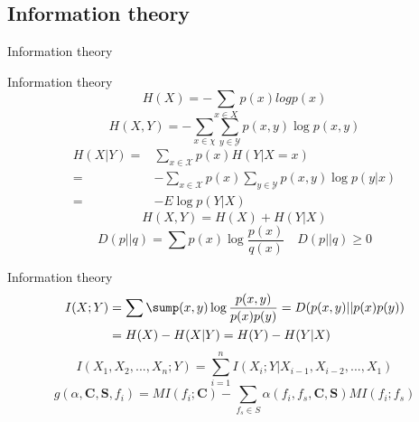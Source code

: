 \documentclass{beamer}
\begin{document}
\subsection{Information theory}
\begin{frame}{}
\begin{center}
{\Huge Information theory}
\end{center}
\end{frame}


\begin{frame}{Information theory}
\begin{equation}
H(X)=-\sum_{x \in X} p(x)log p(x)
\end{equation}
\begin{equation}
H(X,Y)=-\sum_{x\in \chi}\sum_{y\in \mathcal{Y}}p(x,y)\log p(x,y)
\end{equation}
\begin{equation}
\begin{split}
H(X|Y)=& \sum_{x\in \mathcal{X} }p(x)H(Y|X=x)\\
=& -\sum_{x\in \mathcal{X}}p(x)\sum_{y\in \mathcal{Y}}p(x,y)\log p(y|x) \\
=& -E\log p(Y|X)
\end{split}
\end{equation}
\begin{equation}
H(X,Y)=H(X)+H(Y|X)
\end{equation}
\begin{equation}
D(p||q)=\sum p(x)\log\frac{p(x)}{q(x)} \quad D(p||q)\geq 0
\end{equation}

\end{frame}

\begin{frame}{Information theory}
\begin{equation}
\begin{split}
I(X;Y)&=\sum\sump(x,y)\log\dfrac{p(x,y)}{p(x)p(y)}=D(p(x,y)||p(x)p(y)) \\
&=H(X)-H(X|Y)=H(Y)-H(Y|X)
\end{split}
\end{equation}
\begin{equation}
I(X_{1},X_{2},...,X_{n};Y)=\sum^{n}_{i=1}I(X_{i};Y|X_{i-1},X_{i-2},...,X_{1})
\end{equation}
\begin{equation}
g(\alpha,\textbf{C},\textbf{S},f_{i})=MI(f_{i};\textbf{C})-\sum_{f_{s}\in S}\alpha(f_{i},f_{s},\textbf{C},\textbf{S})MI(f_{i};f_{s})
\end{equation}
\end{frame}
\end{document}
